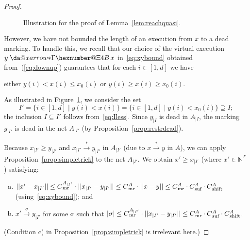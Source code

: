 \documentclass[11pt,a4paper]{amsart}
\makeatletter
\newcommand{\step}[1]{\mathrel{\xrightarrow{#1}}}
\newcommand{\reach}{\step{*}}
\newcommand{\virtual}[1]{\mathrel{\xdashrightarrow{#1}}\hspace{-0.3em}}
\newcommand{\vreach}{\virtual{*}}
\newcommand{\nnorm}[1]{||#1||}
\newcommand{\mr}{{}_\textnormal{mr}}
\newcommand{\suf}{{}_\textnormal{suf}}
\newcommand{\shift}{{}_\textnormal{shift}}
\newcommand{\Nat}{\mathbb{N}}
\newcommand{\restr}[1]{_{|{#1}}}
\newcommand{\setN}{\Nat}
\newcommand*{\da@rightarrow}{\mathchar"0\hexnumber@\symAMSa 4B }
\newcommand*{\xdashrightarrow}[2][]{%
  \mathrel{%
    \mathpalette{\da@xarrow{#1}{#2}{}\da@rightarrow{\,}{}}{}%
  }%
}
\newcommand*{\da@xarrow}[7]{%
  \sbox0{$\ifx#7\scriptstyle\scriptscriptstyle\else\scriptstyle\fi#5#1#6\m@th$}%
  \sbox2{$\ifx#7\scriptstyle\scriptscriptstyle\else\scriptstyle\fi#5#2#6\m@th$}%
  \sbox4{$#7\dabar@\m@th$}%
  \dimen@=\wd0 %
  \ifdim\wd2 >\dimen@
    \dimen@=\wd2 %
  \fi
  \count@=2 %
  \def\da@bars{\dabar@\dabar@}%
  \@whiledim\count@\wd4<\dimen@\do{%
    \advance\count@\@ne
    \expandafter\def\expandafter\da@bars\expandafter{%
      \da@bars
      \dabar@ 
    }%
  }%
  \mathrel{#3}%
  \mathrel{%
    \mathop{\da@bars}\limits
    \ifx\\#1\\%
    \else
      _{\copy0}%
    \fi
    \ifx\\#2\\%
    \else
      ^{\copy2}%
    \fi
  }%
  \mathrel{#4}%
}
\newcommand*{\lastx}{}
\newcommand*{\lasty}{}
\newcommand{\drawconf}[5]{
    \xdef\lastx{#5}
    \foreach \y[count=\i] in {#3} {
        \ifnum \i = 1
            \draw[#1, #2] (\lastx,\y) -- (\lastx+#4,\y);
        \fi
        \ifnum \i > 1
            \draw[#1, #2] (\lastx,\lasty) -- (\lastx,\y);
            \draw[#1, #2] (\lastx,\y) -- (\lastx+#4,\y);
        \fi
        \xdef\lastx{\lastx+#4}
        \xdef\lasty{\y}
    }
}
\theoremstyle{plain}
\theoremstyle{definition}
\theoremstyle{defC}
\theoremstyle{thmC}
\makeatother
\begin{document}
\begin{proof}
\begin{figure}[t]
\begin{center}
\end{center}
\caption{Illustration for the proof of
	Lemma~\ref{lem:reachquasi}.}\label{fig:markingstwo}
\end{figure}
	

\noindent
	However,
	we have not bounded the length of an execution from $x$ to a
	dead marking.
	To handle this, we recall that our choice of 
	the virtual execution $y\vreach{x}$ in~\eqref{eq:xybound} obtained
	from~(\ref{eq:downup}) guarantees that
	for each $i\in[1,d]$ we have
\begin{center}
either $y(i)< x(i)\leq x_0(i)$ or $y(i)\geq x(i)\geq x_0(i)$. 
\end{center}
	As illustrated in Figure~\ref{fig:markingstwo},
we consider the set
\[I'=\{i\in[1,d]\mid y(i)< x(i)\}=\{i\in[1,d]\mid y(i)<
	x_0(i)\}\supseteq I;\] 
	the inclusion $I\subseteq I'$ follows from~\eqref{eq:Iless}.
	 Since
	$y\restr{I}$ is dead in $A\restr{I}$, the marking 
$y\restr{I'}$ is dead in the net $A\restr{I'}$ (by
Proposition~\ref{prop:restrdead}). 

Because $x\restr{I'}\geq y\restr{I'}$ and  $x\restr{I'}\reach
y\restr{I'}$ in  $A\restr{I'}$ (due to $x\reach y$ in  $A$),
we can apply Proposition~\ref{prop:simpletrick} to the net
$A\restr{I'}$. We obtain  $x'\geq
x\restr{I'}$ (where $x'\in\setN^{I'}$) satisfying:
\begin{enumerate}[a)]
	\item 
$\nnorm{x'-x\restr{I'}}\leq 
		C\mr^{A\restr{I'}}\cdot
		\nnorm{x\restr{I'}-y\restr{I'}}\leq C\mr^{A}\cdot
		\nnorm{x-y}\leq  C\mr^{A}\cdot C\suf^A\cdot C\shift^A$
		(using~\eqref{eq:xybound}); and
		\item
			$x'\step{\sigma}y\restr{I'}$ for some $\sigma$ 
			such that $|\sigma|\leq C\mr^{A\restr{I'}}\cdot
	\nnorm{x\restr{I'}-y\restr{I'}}\leq C\mr^{A}\cdot C\suf^A\cdot C\shift^A$.
	\end{enumerate}
(Condition c) in Proposition~\ref{prop:simpletrick} is irrelevant
here.)


\end{proof}
\end{document}
